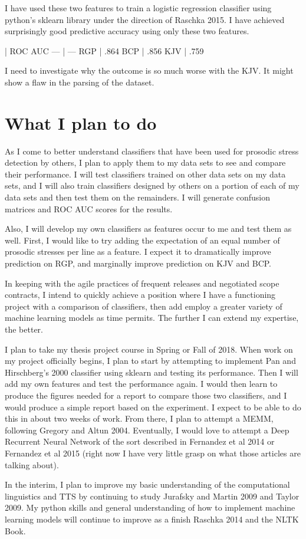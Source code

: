 \documentclass[12pt]{proposal}
\begin{document}
I have used these two features to train a logistic regression classifier using python's sklearn library under the direction of Raschka 2015.
I have achieved surprisingly good predictive accuracy using only these two features.

 | ROC AUC
--- | ---
RGP | .864
BCP | .856
KJV | .759

I need to investigate why the outcome is so much worse with the KJV.
It might show a flaw in the parsing of the dataset.

\section{What I plan to do}

As I come to better understand classifiers that have been used for prosodic stress detection by others, I plan to apply them to my data sets to see and compare their performance.
I will test classifiers trained on other data sets on my data sets, and I will also train classifiers designed by others on a portion of each of my data sets and then test them on the remainders.
I will generate confusion matrices and ROC AUC scores for the results.

Also, I will develop my own classifiers as features occur to me and test them as well.
First, I would like to try adding the expectation of an equal number of prosodic stresses per line as a feature.
I expect it to dramatically improve prediction on RGP, and marginally improve prediction on KJV and BCP.

In keeping with the agile practices of frequent releases and negotiated scope contracts, I intend to quickly achieve a position where I have a functioning project with a comparison of classifiers, then add employ a greater variety of machine learning models as time permits.
The further I can extend my expertise, the better.

I plan to take my thesis project course in Spring or Fall of 2018.
When work on my project officially begins, I plan to start by attempting to implement Pan and Hirschberg's 2000 classifier using sklearn and testing its performance.
Then I will add my own features and test the performance again.
I would then learn to produce the figures needed for a report to compare those two classifiers, and I would produce a simple report based on the experiment.
I expect to be able to do this in about two weeks of work.
From there, I plan to attempt a MEMM, following Gregory and Altun 2004.
Eventually, I would love to attempt a Deep Recurrent Neural Network of the sort described in Fernandez et al 2014 or Fernandez et al 2015 (right now I have very little grasp on what those articles are talking about).

In the interim, I plan to improve my basic understanding of the computational linguistics and TTS by continuing to study Jurafsky and Martin 2009 and Taylor 2009.
My python skills and general understanding of how to implement machine learning models will continue to improve as a finish Raschka 2014 and the NLTK Book.
    

\end{document}
